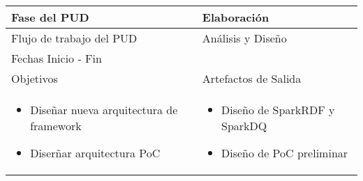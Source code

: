 \vspace{1cm}
\begin{tabular}{|p{}|p{}|}

\hline

\cellcolor[gray]{0.7}Fase del \acs{PUD} & Elaboración
 \\
\hline

\cellcolor[gray]{0.7}Flujo de trabajo del \acs{PUD} & Análisis y Diseño

 \\
\hline

\cellcolor[gray]{0.7}Fechas Inicio - Fin  &
 \\
\hline

\cellcolor[gray]{0.7}Objetivos  &
\cellcolor[gray]{0.7}Artefactos de Salida \\
\hline

\begin{itemize}
\item Diseñar nueva arquitectura de framework
\item Diserñar arquitectura PoC
\end{itemize}

&

\begin{itemize}
\item Diseño de SparkRDF y SparkDQ
\item Diseño de PoC preliminar
\end{itemize}

 \\
\hline
\end{tabular}



